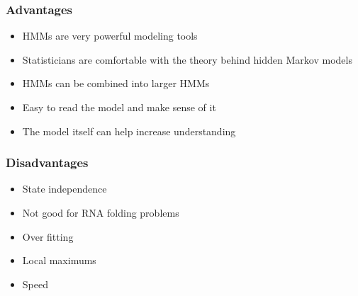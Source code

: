 \documentclass[12pt]{article}
\newenvironment{QandA}{\begin{enumerate}[label=\bfseries\arabic*.]\bfseries}
{\end{enumerate}}
\newenvironment{answered}{\par\normalfont\color{Sepia}}{}
\begin{document}
\begin{QandA}
\begin{answered}
        \subsubsection*{Advantages}
        \begin{itemize}
            \item HMMs are very powerful modeling tools
            \item Statisticians are comfortable with the theory behind hidden Markov models
            \item HMMs can be combined into larger HMMs
            \item Easy to read the model and make sense of it
            \item The model itself can help increase understanding
        \end{itemize}
        \subsubsection*{Disadvantages}
        \begin{itemize}
            \item State independence
            \item Not good for RNA folding problems
            \item Over fitting
            \item Local maximums
            \item Speed
        \end{itemize}

    \end{answered}

\end{QandA}
\end{document}
